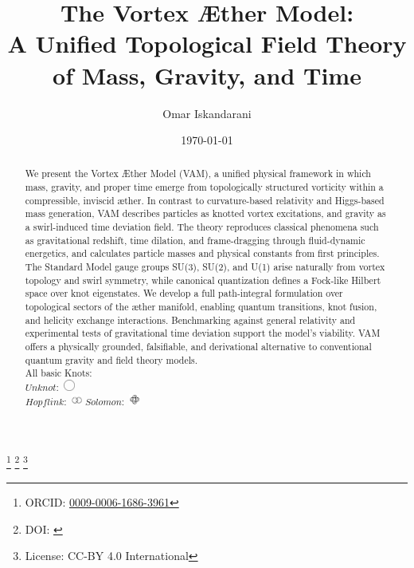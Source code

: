 \documentclass[preprint]{revtex4-2}
\begin{document}
\title{The Vortex Æther Model: \\[1ex]
        \large A Unified Topological Field Theory of Mass, Gravity, and Time}

\author{Omar Iskandarani}
\thanks{ORCID: \href{https://orcid.org/0009-0006-1686-3961}{0009-0006-1686-3961}}
\thanks{DOI: \href{https://doi.org/\paperdoi}{\paperdoi}}
\thanks{License: CC-BY 4.0 International}

\date{\today}

\begin{abstract}
            We present the Vortex Æther Model (VAM), a unified physical framework in which mass, gravity, and proper time emerge from topologically structured vorticity within a compressible, inviscid æther. In contrast to curvature-based relativity and Higgs-based mass generation, VAM describes particles as knotted vortex excitations, and gravity as a swirl-induced time deviation field. The theory reproduces classical phenomena such as gravitational redshift, time dilation, and frame-dragging through fluid-dynamic energetics, and calculates particle masses and physical constants from first principles. The Standard Model gauge groups SU(3), SU(2), and U(1) arise naturally from vortex topology and swirl symmetry, while canonical quantization defines a Fock-like Hilbert space over knot eigenstates. We develop a full path-integral formulation over topological sectors of the æther manifold, enabling quantum transitions, knot fusion, and helicity exchange interactions. Benchmarking against general relativity and experimental tests of gravitational time deviation support the model’s viability. VAM offers a physically grounded, falsifiable, and derivational alternative to conventional quantum gravity and field theory models.\\
            All basic Knots:\\
            \( Unknot \):~\includegraphics[height=1.2em]{images/0_1} \\
            \( Hopf link \):~\includegraphics[height=1.2em]{images/hopf}  \( Solomon \):~\includegraphics[height=1.2em]{images/solomon} \\

\end{abstract}
\end{document}
